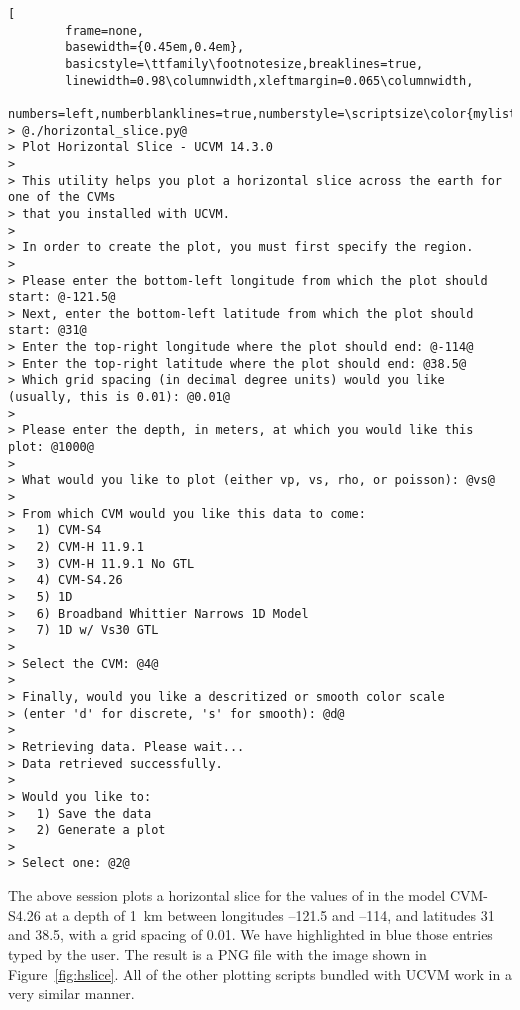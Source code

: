 \begin{lstlisting}[
        frame=none,
        basewidth={0.45em,0.4em},
        basicstyle=\ttfamily\footnotesize,breaklines=true,
        linewidth=0.98\columnwidth,xleftmargin=0.065\columnwidth,
        numbers=left,numberblanklines=true,numberstyle=\scriptsize\color{mylistingnclr},style=input]
> @./horizontal_slice.py@
> Plot Horizontal Slice - UCVM 14.3.0
>
> This utility helps you plot a horizontal slice across the earth for one of the CVMs
> that you installed with UCVM.
>
> In order to create the plot, you must first specify the region.
>
> Please enter the bottom-left longitude from which the plot should start: @-121.5@
> Next, enter the bottom-left latitude from which the plot should start: @31@
> Enter the top-right longitude where the plot should end: @-114@
> Enter the top-right latitude where the plot should end: @38.5@
> Which grid spacing (in decimal degree units) would you like (usually, this is 0.01): @0.01@
>
> Please enter the depth, in meters, at which you would like this plot: @1000@
>
> What would you like to plot (either vp, vs, rho, or poisson): @vs@
>
> From which CVM would you like this data to come:
>	1) CVM-S4
>	2) CVM-H 11.9.1
>	3) CVM-H 11.9.1 No GTL
>	4) CVM-S4.26
>	5) 1D
>	6) Broadband Whittier Narrows 1D Model
>	7) 1D w/ Vs30 GTL
>
> Select the CVM: @4@
>
> Finally, would you like a descritized or smooth color scale
> (enter 'd' for discrete, 's' for smooth): @d@
>
> Retrieving data. Please wait...
> Data retrieved successfully.
>
> Would you like to:
>	1) Save the data
>	2) Generate a plot
>
> Select one: @2@
\end{lstlisting}

The above session plots a horizontal slice for the values of \vs{} in the model CVM-S4.26 at a depth of 1~km between longitudes --121.5\textdegree{} and --114\textdegree{}, and latitudes 31\textdegree{} and 38.5\textdegree{}, with a grid spacing of 0.01\textdegree{}. We have highlighted in blue those entries typed by the user. The result is a PNG file with the image shown in Figure~\ref{fig:hslice}. All of the other plotting scripts bundled with UCVM work in a very similar manner.




